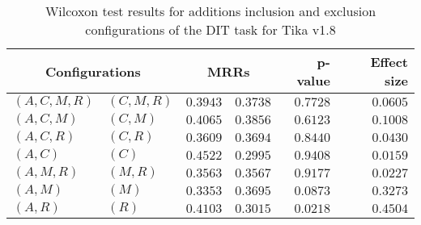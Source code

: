 
\begin{table}
\begin{spacing}{1.2}
\centering
\caption{Wilcoxon test results for additions inclusion and exclusion configurations of the DIT task for Tika v1.8}
\label{table:versus-wilcox-tika-dit-additions}
\begin{tabular}{ll|rr|rr}
\toprule
      \multicolumn{2}{c|}{Configurations} &          \multicolumn{2}{c|}{MRRs} &       p-value & Effect size \\
\midrule
 $(A,C,M,R)$ &  $(C,M,R)$ & $0.3943$ & $0.3738$ & $0.7728$ &    $0.0605$ \\
   $(A,C,M)$ &    $(C,M)$ & $0.4065$ & $0.3856$ & $0.6123$ &    $0.1008$ \\
   $(A,C,R)$ &    $(C,R)$ & $0.3609$ & $0.3694$ & $0.8440$ &    $0.0430$ \\
     $(A,C)$ &      $(C)$ & $0.4522$ & $0.2995$ & $0.9408$ &    $0.0159$ \\
   $(A,M,R)$ &    $(M,R)$ & $0.3563$ & $0.3567$ & $0.9177$ &    $0.0227$ \\
     $(A,M)$ &      $(M)$ & $0.3353$ & $0.3695$ & $0.0873$ &    $0.3273$ \\
     $(A,R)$ &      $(R)$ & $0.4103$ & $0.3015$ & $0.0218$ &    $0.4504$ \\
\bottomrule
\end{tabular}

\end{spacing}
\end{table}

